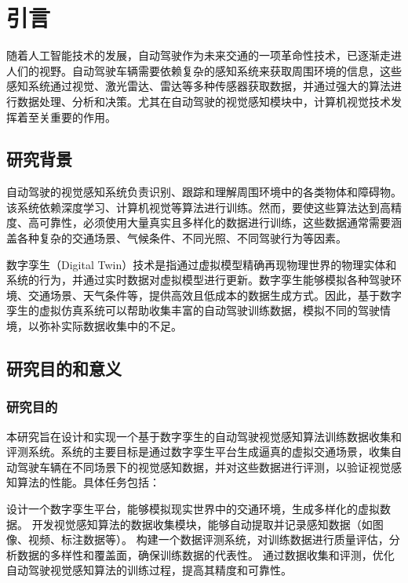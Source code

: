 \chapter{引言}

随着人工智能技术的发展，自动驾驶作为未来交通的一项革命性技术，已逐渐走进人们的视野。自动驾驶车辆需要依赖复杂的感知系统来获取周围环境的信息，这些感知系统通过视觉、激光雷达、雷达等多种传感器获取数据，并通过强大的算法进行数据处理、分析和决策。尤其在自动驾驶的视觉感知模块中，计算机视觉技术发挥着至关重要的作用。

\section{研究背景}


自动驾驶的视觉感知系统负责识别、跟踪和理解周围环境中的各类物体和障碍物。该系统依赖深度学习、计算机视觉等算法进行训练。然而，要使这些算法达到高精度、高可靠性，必须使用大量真实且多样化的数据进行训练，这些数据通常需要涵盖各种复杂的交通场景、气候条件、不同光照、不同驾驶行为等因素。

数字孪生（Digital Twin）技术是指通过虚拟模型精确再现物理世界的物理实体和系统的行为，并通过实时数据对虚拟模型进行更新。数字孪生能够模拟各种驾驶环境、交通场景、天气条件等，提供高效且低成本的数据生成方式。因此，基于数字孪生的虚拟仿真系统可以帮助收集丰富的自动驾驶训练数据，模拟不同的驾驶情境，以弥补实际数据收集中的不足。



\section{研究目的和意义}

\subsection{研究目的}
本研究旨在设计和实现一个基于数字孪生的自动驾驶视觉感知算法训练数据收集和评测系统。系统的主要目标是通过数字孪生平台生成逼真的虚拟交通场景，收集自动驾驶车辆在不同场景下的视觉感知数据，并对这些数据进行评测，以验证视觉感知算法的性能。具体任务包括：

设计一个数字孪生平台，能够模拟现实世界中的交通环境，生成多样化的虚拟数据。
开发视觉感知算法的数据收集模块，能够自动提取并记录感知数据（如图像、视频、标注数据等）。
构建一个数据评测系统，对训练数据进行质量评估，分析数据的多样性和覆盖面，确保训练数据的代表性。
通过数据收集和评测，优化自动驾驶视觉感知算法的训练过程，提高其精度和可靠性。

